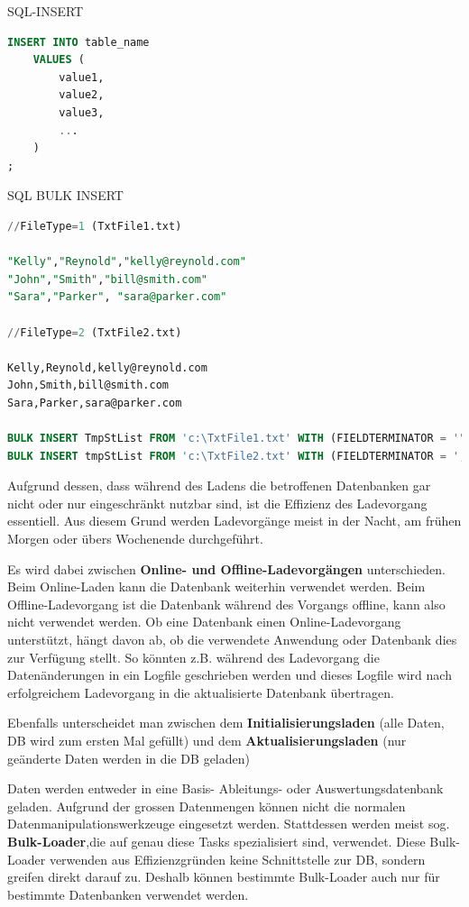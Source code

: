 \documentclass[a4paper, 11pt]{article}
\begin{document}
\noindent SQL-INSERT

\begin{lstlisting}[language=SQL]
INSERT INTO table_name
	VALUES (
		value1,
		value2,
		value3,
		...
	)
; 
\end{lstlisting}

\noindent SQL BULK INSERT

\begin{lstlisting}[language=SQL]
//FileType=1 (TxtFile1.txt)

"Kelly","Reynold","kelly@reynold.com" 
"John","Smith","bill@smith.com" 
"Sara","Parker", "sara@parker.com"

//FileType=2 (TxtFile2.txt) 

Kelly,Reynold,kelly@reynold.com 
John,Smith,bill@smith.com 
Sara,Parker,sara@parker.com 

BULK INSERT TmpStList FROM 'c:\TxtFile1.txt' WITH (FIELDTERMINATOR = '","') 
BULK INSERT tmpStList FROM 'c:\TxtFile2.txt' WITH (FIELDTERMINATOR = ',')
\end{lstlisting}


\vspace{10px}

\noindent Aufgrund dessen, dass während des Ladens die betroffenen Datenbanken gar nicht oder nur eingeschränkt nutzbar sind, ist die Effizienz des Ladevorgang essentiell. Aus diesem Grund werden Ladevorgänge meist in der Nacht, am frühen Morgen oder übers Wochenende durchgeführt.

Es wird dabei zwischen \textbf{Online- und Offline-Ladevorgängen} unterschieden. Beim Online-Laden kann die Datenbank weiterhin verwendet werden. Beim Offline-Ladevorgang ist die Datenbank während des Vorgangs offline, kann also nicht verwendet werden. Ob eine Datenbank einen Online-Ladevorgang unterstützt, hängt davon ab, ob die verwendete Anwendung oder Datenbank dies zur Verfügung stellt. So könnten z.B. während des Ladevorgang die Datenänderungen in ein Logfile geschrieben werden und dieses Logfile wird nach erfolgreichem Ladevorgang in die aktualisierte Datenbank übertragen.

Ebenfalls unterscheidet man zwischen dem \textbf{Initialisierungsladen} (alle Daten, DB wird zum ersten Mal gefüllt) und dem \textbf{Aktualisierungsladen} (nur geänderte Daten werden in die DB geladen)

Daten werden entweder in eine Basis- Ableitungs- oder Auswertungsdatenbank geladen. Aufgrund der grossen Datenmengen können nicht die normalen Datenmanipulationswerkzeuge eingesetzt werden. Stattdessen werden meist sog. \textbf{Bulk-Loader},die auf genau diese Tasks spezialisiert sind, verwendet. Diese Bulk-Loader verwenden aus Effizienzgründen keine Schnittstelle zur DB, sondern greifen direkt darauf zu. Deshalb können bestimmte Bulk-Loader auch nur für bestimmte Datenbanken verwendet werden. 
\end{document}
